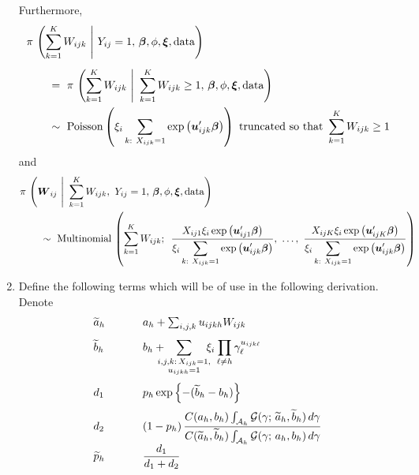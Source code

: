 \documentclass[11pt]{article}
\renewcommand{\vec}{\boldsymbol}
\newcommand{\barBBB}{~\Bigg|~}
\newcommand{\gammaExprUisOne}{ \hspace{3mm} \sum_{\mathclap{\substack{i,j,k{:}\, X_{ijk}=1, \\ u_{ijkh} = 1}}} \hspace{4mm} \xi_i \prod_{\ell \ne h} \gamma_\ell^{ u_{ijk\ell} } }
\begin{document}
\begin{enumerate}[label=Step \arabic*., leftmargin=13mm, itemsep=10mm]
Furthermore,
\begin{align*} \MoveEqLeft
\pi\,\left( \sum_{k=1}^K W_{ijk} \barBBB Y_{ij} = 1,\, \vec{\beta}, \phi, \vec{\xi}, \text{data} \right) \\[1ex]
&=~ \pi\,\left( \sum_{k=1}^K W_{ijk} \barBBB \sum_{k=1}^K W_{ijk} \geq 1,\, \vec{\beta}, \phi, \vec{\xi}, \text{data} \right) \\
&\sim~ \text{Poisson} \left( \xi_i \sum_{k{:}~ X_{ijk}=1} \exp \left(\vec{u}_{ijk}^\prime \vec{\beta}\right) \right) \text{ truncated so that } \sum_{k=1}^K W_{ijk} \geq 1
\end{align*}
and
\begin{align*} \MoveEqLeft
\pi\,\left( \vec{W}_{ij} \barBBB \sum_{k=1}^K W_{ijk},~  Y_{ij} = 1,\, \vec{\beta}, \phi, \vec{\xi}, \text{data} \right) \\
&\sim~ \text{Multinomial}\, \left( \sum_{k=1}^K W_{ijk};~\, \frac{ X_{ij1} \xi_i \exp \left(\vec{u}_{ij1}^\prime \vec{\beta} \right) }{ \displaystyle \xi_i \sum_{k{:}~ X_{ijk}=1} \exp \left(\vec{u}_{ijk}^\prime \vec{\beta}\right) },~ \dots,~ \frac{ X_{ijK} \xi_i \exp\left( \vec{u}_{ijK}^\prime \vec{\beta} \right) }{ \displaystyle \xi_i \sum_{k{:}~ X_{ijk}=1} \exp \left(\vec{u}_{ijk}^\prime \vec{\beta}\right) } \right)
\end{align*}





\item 
Define the following terms which will be of use in the following derivation.  Denote
\[ \begin{array}{lll}
\widetilde{a}_h & \hspace{5mm} & a_h + \sum_{i,j,k} u_{ijkh} W_{ijk} \\[2ex]
\widetilde{b}_h & & \displaystyle b_h + \gammaExprUisOne \\[6ex]
d_1 & & p_h \exp\left\{ -(\widetilde{b}_h - b_h) \right\} \\[2ex]
d_2 &  & \displaystyle (1 - p_h)\, \frac{ C(a_h,b_h) \int_{\mathcal{A}_h} \mathcal{G}(\gamma;\, \widetilde{a}_h, \widetilde{b}_h)\, d\gamma }{ C(\widetilde{a}_h, \widetilde{b}_h) \int_{\mathcal{A}_h} \mathcal{G}(\gamma;\, a_h, b_h)\, d\gamma } \\[2ex]
\widetilde{p}_h & & \displaystyle \frac{ d_1 }{ d_1 + d_2 }
\end{array} \]


\end{enumerate}
\end{document}

